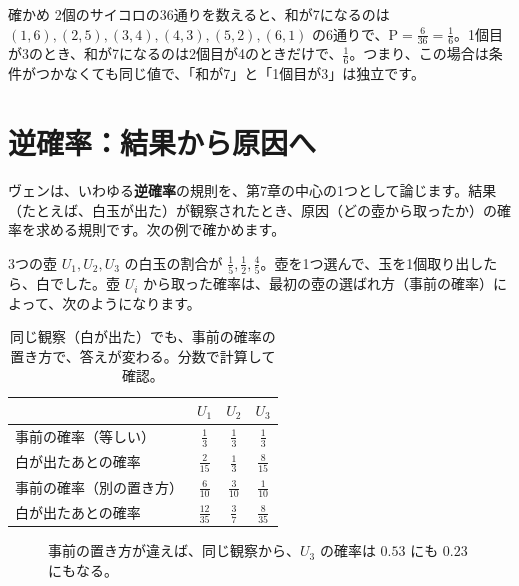 \documentclass[a4paper,11pt,openany]{ltjsbook}
\newcommand{\Prob}{\mathrm{P}}
\begin{document}
\begin{examplebox}{確かめ}
2個のサイコロの36通りを数えると、和が7になるのは $(1,6),(2,5),(3,4),(4,3),(5,2),(6,1)$ の6通りで、$\Prob=\tfrac{6}{36}=\tfrac16$。1個目が3のとき、和が7になるのは2個目が4のときだけで、$\tfrac16$。つまり、この場合は条件がつかなくても同じ値で、「和が7」と「1個目が3」は独立です。
\end{examplebox}

\section{逆確率：結果から原因へ}

ヴェンは、いわゆる\textbf{逆確率}の規則を、第7章の中心の1つとして論じます。結果（たとえば、白玉が出た）が観察されたとき、原因（どの壺から取ったか）の確率を求める規則です。次の例で確かめます。

3つの壺 $U_1,U_2,U_3$ の白玉の割合が $\tfrac15,\tfrac12,\tfrac45$。壺を1つ選んで、玉を1個取り出したら、白でした。壺 $U_i$ から取った確率は、最初の壺の選ばれ方（事前の確率）によって、次のようになります。

\begin{table}[htbp]
\centering
\begin{tabular}{l|ccc}
\toprule
 & $U_1$ & $U_2$ & $U_3$\\
\midrule
事前の確率（等しい） & $\tfrac13$ & $\tfrac13$ & $\tfrac13$\\
白が出たあとの確率 & $\tfrac2{15}$ & $\tfrac13$ & $\tfrac8{15}$\\
\midrule
事前の確率（別の置き方） & $\tfrac{6}{10}$ & $\tfrac{3}{10}$ & $\tfrac{1}{10}$\\
白が出たあとの確率 & $\tfrac{12}{35}$ & $\tfrac37$ & $\tfrac8{35}$\\
\bottomrule
\end{tabular}
\caption{同じ観察（白が出た）でも、事前の確率の置き方で、答えが変わる。分数で計算して確認。}
\end{table}

\begin{figure}[htbp]
\centering
{}
\caption{事前の置き方が違えば、同じ観察から、$U_3$ の確率は $0.53$ にも $0.23$ にもなる。}
\end{figure}
\end{document}
